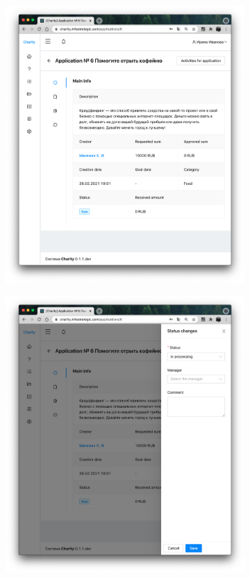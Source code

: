 \documentclass[a4paper,12pt,reqno]{article}
\begin{document}
	\begin{figure}[H]
		\centering
		\begin{subfigure}[b]{0.475\linewidth}
			\includegraphics[width=\linewidth]{img/test/1.png}
		\end{subfigure}
		\begin{subfigure}[b]{0.475\linewidth}
			\includegraphics[width=\linewidth]{img/test/2.png}

\end{subfigure}
\end{figure}
\end{document}
